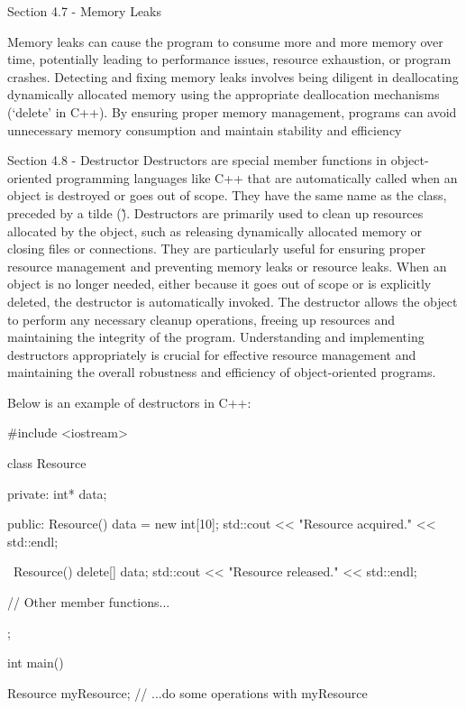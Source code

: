 \begin{notes}{Section 4.7 - Memory Leaks}
\begin{highlight}
        Memory leaks can cause the program to consume more and more memory over time, potentially leading to performance issues, resource exhaustion, or program crashes. Detecting and fixing memory leaks involves being diligent in deallocating dynamically 
        allocated memory using the appropriate deallocation mechanisms (`delete' in C++). By ensuring proper memory management, programs can avoid unnecessary memory consumption and maintain stability and efficiency
    \end{highlight}
\end{notes}

\begin{notes}{Section 4.8 - Destructor}
    Destructors are special member functions in object-oriented programming languages like C++ that are automatically called when an object is destroyed or goes out of scope. They have the same name as the class, preceded by a tilde (\~). Destructors are 
    primarily used to clean up resources allocated by the object, such as releasing dynamically allocated memory or closing files or connections. They are particularly useful for ensuring proper resource management and preventing memory leaks or resource 
    leaks. When an object is no longer needed, either because it goes out of scope or is explicitly deleted, the destructor is automatically invoked. The destructor allows the object to perform any necessary cleanup operations, freeing up resources and 
    maintaining the integrity of the program. Understanding and implementing destructors appropriately is crucial for effective resource management and maintaining the overall robustness and efficiency of object-oriented programs.
    
    \begin{highlight}
        Below is an example of destructors in C++:
        
    \begin{code}[C++]   
    #include <iostream>

    class Resource {
    private:
        int* data;
    
    public:
        Resource() {
            data = new int[10];
            std::cout << "Resource acquired." << std::endl;
        }
    
        ~Resource() {
            delete[] data;
            std::cout << "Resource released." << std::endl;
        }
    
        // Other member functions...
    };
    
    int main() {
        Resource myResource;
        // ...do some operations with myResource
    
}
\end{code}
\end{highlight}
\end{notes}
